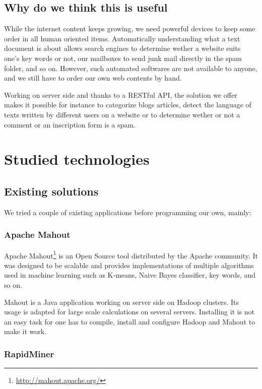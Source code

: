 \documentclass[a4paper,11pt]{article}
\begin{document}
\subsection{Why do we think this is useful}

While the internet content keeps growing, we need powerful devices to keep
some order in all human oriented items. Automatically understanding what a
text document is about allows search engines to determine wether a website
suits one's key words or not, our mailboxes to send junk mail directly in the
spam folder, and so on. However, such automated softwares are not available to
anyone, and we still have to order our own web contents by hand.

Working on server side and thanks to a RESTful API, the solution we offer
makes it possible for instance to categorize blogs articles, detect the
language of texts written by different users on a website or to determine
wether or not a comment or an inscription form is a spam.


\section{Studied technologies}

\subsection{Existing solutions}

We tried a couple of existing applications before programming our own, mainly:

\subsubsection{Apache Mahout}

Apache Mahout\footnote{\url{http://mahout.apache.org/}} is an Open Source tool
distributed by the Apache community.
It was designed to be scalable and provides implementations of multiple
algorithms used in machine learning such as K-means, Naive Bayes classifier,
key words, and so on.

Mahout is a Java application working on server side on Hadoop clusters. Its
usage is adapted for large scale calculations on several servers. Installing
it is not an easy task for one has to compile, install and configure Hadoop
and Mahout to make it work.


\subsubsection{RapidMiner}
\end{document}
